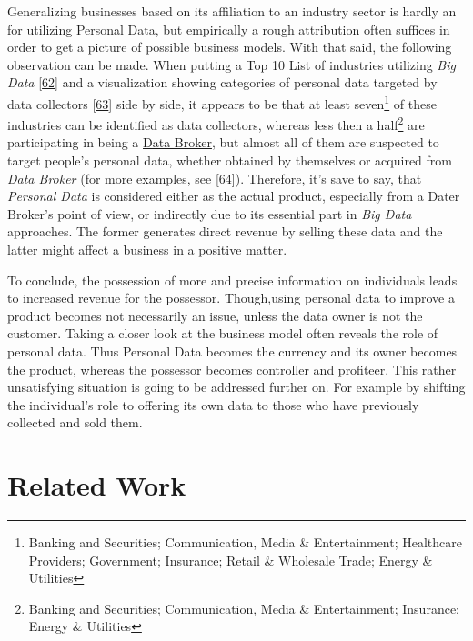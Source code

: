 \documentclass[12pt,english,a4paper,titlepage,cleardoublepage=empty,dottedtoc]{report}
\begin{document}
Generalizing businesses based on its affiliation to an industry sector
is hardly an for utilizing Personal Data, but empirically a rough
attribution often suffices in order to get a picture of possible
business models. With that said, the following observation can be made.
When putting a Top 10 List of industries utilizing \emph{Big Data}
{[}\protect\hyperlink{ref-graphic_2015_applications-of-big-data-in-10-industry-verticals}{62}{]}
and a visualization showing categories of personal data targeted by data
collectors
{[}\protect\hyperlink{ref-graphic_2012_personal-data-ecosystem}{63}{]}
side by side, it appears to be that at least seven\footnote{Banking and
  Securities; Communication, Media \& Entertainment; Healthcare
  Providers; Government; Insurance; Retail \& Wholesale Trade; Energy \&
  Utilities} of these industries can be identified as data collectors,
whereas less then a half\footnote{Banking and Securities; Communication,
  Media \& Entertainment; Insurance; Energy \& Utilities} are
participating in being a
\protect\hyperlink{terminologies--data-broker}{Data Broker}, but almost
all of them are suspected to target people's personal data, whether
obtained by themselves or acquired from \emph{Data Broker} (for more
examples, see
{[}\protect\hyperlink{ref-video_2016_corporate-surveillance-digital-tracking-big-data-privacy}{64}{]}).
Therefore, it's save to say, that \emph{Personal Data} is considered
either as the actual product, especially from a Dater Broker's point of
view, or indirectly due to its essential part in \emph{Big Data}
approaches. The former generates direct revenue by selling these data
and the latter might affect a business in a positive matter.

To conclude, the possession of more and precise information on
individuals leads to increased revenue for the possessor. Though,using
personal data to improve a product becomes not necessarily an issue,
unless the data owner is not the customer. Taking a closer look at the
business model often reveals the role of personal data. Thus Personal
Data becomes the currency and its owner becomes the product, whereas the
possessor becomes controller and profiteer. This rather unsatisfying
situation is going to be addressed further on. For example by shifting
the individual's role to offering its own data to those who have
previously collected and sold them.

\hypertarget{related-work}{\section{Related Work}\label{related-work}}
\end{document}
